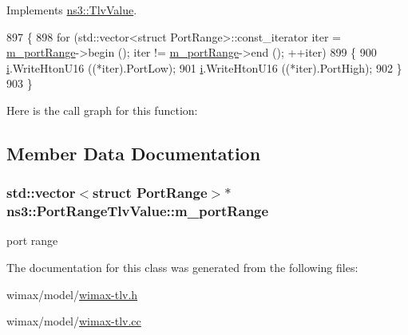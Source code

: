Implements \hyperlink{classns3_1_1TlvValue_aeec8825728398e18337efd9cb40a2aa4}{ns3\+::\+Tlv\+Value}.


\begin{DoxyCode}
897 \{
898   \textcolor{keywordflow}{for} (std::vector<struct PortRange>::const\_iterator iter = \hyperlink{classns3_1_1PortRangeTlvValue_a645324f803fd3cb32002e51da7ac1389}{m\_portRange}->begin (); iter != 
      \hyperlink{classns3_1_1PortRangeTlvValue_a645324f803fd3cb32002e51da7ac1389}{m\_portRange}->end (); ++iter)
899     \{
900       \hyperlink{bernuolliDistribution_8m_a6f6ccfcf58b31cb6412107d9d5281426}{i}.WriteHtonU16 ((*iter).PortLow);
901       \hyperlink{bernuolliDistribution_8m_a6f6ccfcf58b31cb6412107d9d5281426}{i}.WriteHtonU16 ((*iter).PortHigh);
902     \}
903 \}
\end{DoxyCode}


Here is the call graph for this function\+:




\subsection{Member Data Documentation}
\subsubsection[{\texorpdfstring{m\+\_\+port\+Range}{m_portRange}}]{\setlength{\rightskip}{0pt plus 5cm}std\+::vector$<$struct {\bf Port\+Range}$>$$\ast$ ns3\+::\+Port\+Range\+Tlv\+Value\+::m\+\_\+port\+Range\hspace{0.3cm}{\ttfamily [private]}}\hypertarget{classns3_1_1PortRangeTlvValue_a645324f803fd3cb32002e51da7ac1389}{}\label{classns3_1_1PortRangeTlvValue_a645324f803fd3cb32002e51da7ac1389}


port range 



The documentation for this class was generated from the following files\+:\begin{DoxyCompactItemize}
\item 
wimax/model/\hyperlink{wimax-tlv_8h}{wimax-\/tlv.\+h}\item 
wimax/model/\hyperlink{wimax-tlv_8cc}{wimax-\/tlv.\+cc}\end{DoxyCompactItemize}
